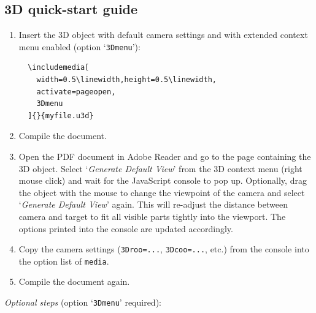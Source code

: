 \documentclass[a4paper]{article}
\begin{document}
\subsection{3D quick-start guide}\label{sec:3Dtut}
\begin{enumerate}
  \item Insert the 3D object with default camera settings and with extended context menu enabled (option `\verb+3Dmenu+'):

\begin{Verbatim}
  \includemedia[
    width=0.5\linewidth,height=0.5\linewidth,
    activate=pageopen,
    3Dmenu
  ]{}{myfile.u3d}
\end{Verbatim}

  \item Compile the document.
  \item Open the PDF document in Adobe Reader and go to the page containing the 3D object. Select `\emph{\sffamily Generate Default View}' from the 3D context menu (right mouse click) and wait for the JavaScript console to pop up. Optionally, drag the object with the mouse to change the viewpoint of the camera and select `\emph{\sffamily Generate Default View}' again. This will re-adjust the distance between camera and target to fit all visible parts tightly into the viewport. The options printed into the console are updated accordingly.
  \item Copy the camera settings ({\tt 3Droo=...}, {\tt 3Dcoo=...}, etc.) from the console into the option list of {\tt \string\-media}.
  \item Compile the document again.
  \xdef\lastcount{\theenumi}
\end{enumerate}

\emph{Optional steps} (option `{\tt 3Dmenu}' required):
\end{document}
